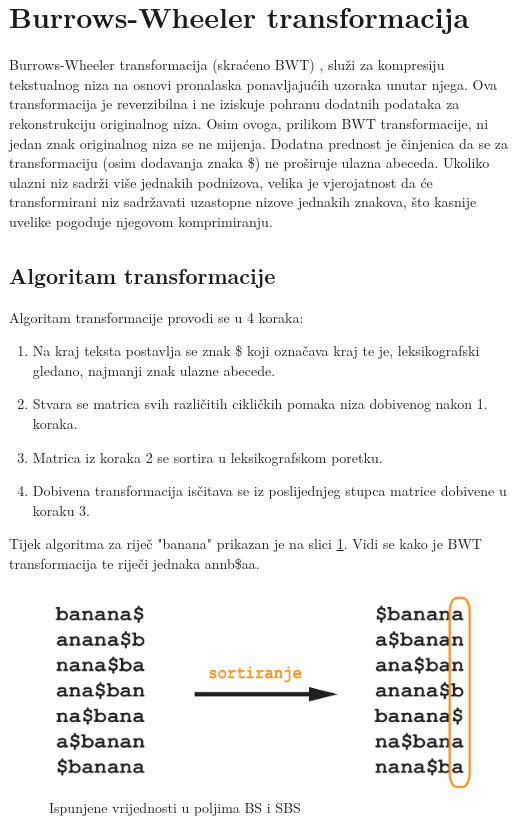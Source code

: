 \section{Burrows-Wheeler transformacija}
Burrows-Wheeler transformacija (skraćeno BWT) \cite{bwt1}, služi za kompresiju tekstualnog niza na osnovi pronalaska ponavljajućih uzoraka unutar njega. Ova transformacija je reverzibilna i ne iziskuje pohranu dodatnih podataka za rekonstrukciju originalnog niza. Osim ovoga, prilikom BWT transformacije, ni jedan znak originalnog niza se ne mijenja. Dodatna prednost je činjenica da se za transformaciju (osim dodavanja znaka \$) ne proširuje ulazna abeceda. Ukoliko ulazni niz sadrži više jednakih podnizova, velika je vjerojatnost da će transformirani niz sadržavati uzastopne nizove jednakih znakova, što kasnije uvelike pogoduje njegovom komprimiranju.

\subsection{Algoritam transformacije}
Algoritam transformacije provodi se u 4 koraka:

\begin{enumerate}
  \item Na kraj teksta postavlja se znak \$ koji označava kraj te je, leksikografski gledano, najmanji znak ulazne abecede.
  \item Stvara se matrica svih različitih cikličkih pomaka niza dobivenog nakon 1. koraka.
  \item Matrica iz koraka 2 se sortira u leksikografskom poretku.
  \item Dobivena transformacija isčitava se iz poslijednjeg stupca matrice dobivene u koraku 3.

\end{enumerate}

Tijek algoritma za riječ "banana" prikazan je na slici \ref{bwt1}. Vidi se kako je BWT transformacija te riječi jednaka annb\$aa. 


\begin{figure}[H]
\centering
\includegraphics[scale=0.2]{./pictures/bwt.jpg}
\caption{Ispunjene vrijednosti u poljima BS i SBS}\label{bwt1}
\end{figure}


